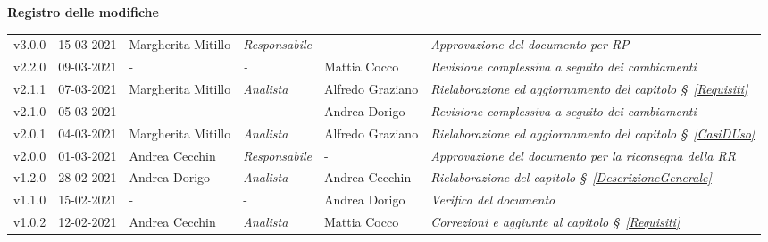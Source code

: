 \quad
\begin{center}
	\LARGE\textbf{Registro delle modifiche}
\end{center}
\def\tabularxcolumn#1{m{#1}}
{

\begin{center}
	\renewcommand{\arraystretch}{1.4}
	\begin{longtable}[c]{|p{2cm-1\tabcolsep}|p{2cm}|p{3cm-2\tabcolsep}|p{}|p{}|p{4cm-2\tabcolsep}|}
		\hline
		\rowcolor{airforceblue}
		\makecell[c]{\textbf{Versione}} & \makecell[c]{\textbf{Data}} & \makecell[c]{\textbf{Autore}} & \makecell[c]{\textbf{Ruolo}} & \makecell[c]{\textbf{Verificatore}} & \makecell[c]{\textbf{Modifica}}\\
		\hline
		\centering v3.0.0 & 15-03-2021 & Margherita Mitillo & \centering \textit{Responsabile} & \centering - & \textit{Approvazione del documento per RP} \\
		\hline
		\centering v2.2.0 & 09-03-2021 &\centering - & \centering \textit{-} & \centering Mattia Cocco & \textit{Revisione complessiva a seguito dei cambiamenti} \\
		\hline
		\centering v2.1.1 & 07-03-2021 & Margherita Mitillo & \centering \textit{Analista} & \centering Alfredo Graziano & \textit{Rielaborazione ed aggiornamento del capitolo \S~\ref{Requisiti}} \\
		\hline
		\centering v2.1.0 & 05-03-2021 &\centering - & \centering \textit{-} & \centering Andrea Dorigo & \textit{Revisione complessiva a seguito dei cambiamenti} \\
		\hline
		\centering v2.0.1 & 04-03-2021 & Margherita Mitillo & \centering \textit{Analista} & \centering Alfredo Graziano & \textit{Rielaborazione ed aggiornamento del capitolo \S~\ref{CasiDUso}} \\
		\hline
		\centering v2.0.0 & 01-03-2021 & Andrea Cecchin & \centering \textit{Responsabile} & \centering - & \textit{Approvazione del documento per la riconsegna della RR} \\
		\hline
		\centering v1.2.0 & 28-02-2021 & Andrea Dorigo & \centering \textit{Analista} & Andrea Cecchin & \textit{Rielaborazione del capitolo \S~\ref{DescrizioneGenerale}} \\
		\hline
		\hline
		\centering v1.1.0 & 15-02-2021 & \centering - & \centering - & Andrea Dorigo & \textit{Verifica del documento} \\
		\hline
		\centering v1.0.2 & 12-02-2021 & Andrea Cecchin & \centering \textit{Analista} & Mattia Cocco & \textit{Correzioni e aggiunte al capitolo \S~\ref{Requisiti}} \\

\end{longtable}
\end{center}}
